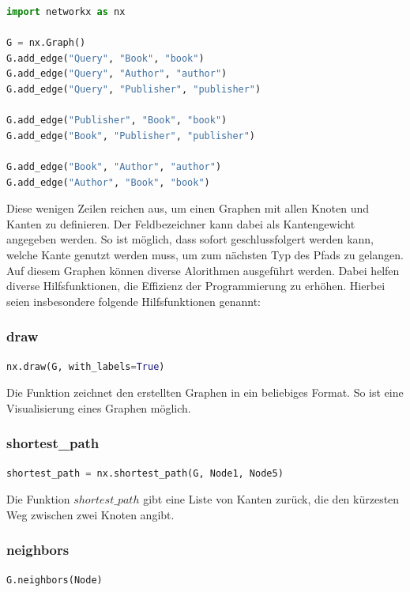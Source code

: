 \begin{lstlisting}[language=Python, caption={NetworkX-Graphen erstellen}, label={networkxgraph}]
import networkx as nx

G = nx.Graph()
G.add_edge("Query", "Book", "book")
G.add_edge("Query", "Author", "author")
G.add_edge("Query", "Publisher", "publisher")

G.add_edge("Publisher", "Book", "book")
G.add_edge("Book", "Publisher", "publisher")

G.add_edge("Book", "Author", "author")
G.add_edge("Author", "Book", "book")
\end{lstlisting}

Diese wenigen Zeilen reichen aus, um einen Graphen mit allen Knoten und Kanten zu definieren.
Der Feldbezeichner kann dabei als Kantengewicht angegeben werden.
So ist möglich, dass sofort geschlussfolgert werden kann, welche Kante genutzt werden muss, um zum nächsten Typ des Pfads zu gelangen.
Auf diesem Graphen können diverse Alorithmen ausgeführt werden.
Dabei helfen diverse Hilfsfunktionen, die Effizienz der Programmierung zu erhöhen.
Hierbei seien insbesondere folgende Hilfsfunktionen genannt:

\subsubsection{draw}
    \begin{lstlisting}[language=Python, caption={Ein Graphen visualisieren}]
nx.draw(G, with_labels=True)
    \end{lstlisting}

Die Funktion zeichnet den erstellten Graphen in ein beliebiges Format.
So ist eine Visualisierung eines Graphen möglich.

\subsubsection{shortest\_path}
    \begin{lstlisting}[language=Python, caption={Der kürzeste Weg zwischen zwei Knoten}]
shortest_path = nx.shortest_path(G, Node1, Node5)
    \end{lstlisting}

Die Funktion $shortest\_path$ gibt eine Liste von Kanten zurück, die den kürzesten Weg zwischen zwei Knoten angibt.

\subsubsection{neighbors}
    \begin{lstlisting}[language=Python, caption={Alle Nachbarn eines Knoten}]
G.neighbors(Node)
    \end{lstlisting}

